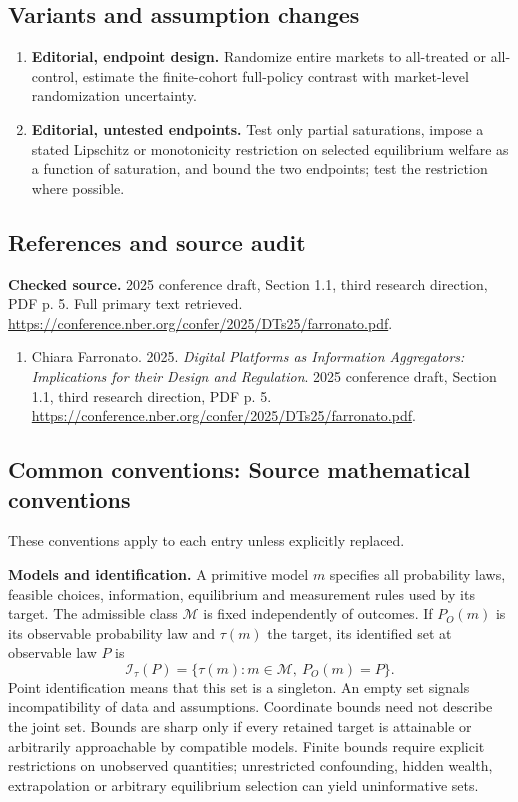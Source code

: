 \documentclass[11pt,a4paper]{article}
\begin{document}
\subsection*{Variants and assumption changes}
\begin{enumerate}
\item \textbf{Editorial, endpoint design.} Randomize entire markets to all-treated or all-control, estimate the finite-cohort full-policy contrast with market-level randomization uncertainty.
\item \textbf{Editorial, untested endpoints.} Test only partial saturations, impose a stated Lipschitz or monotonicity restriction on selected equilibrium welfare as a function of saturation, and bound the two endpoints; test the restriction where possible.
\end{enumerate}
\subsection*{References and source audit}
\textbf{Checked source.} 2025 conference draft, Section 1.1, third research direction, PDF p. 5. Full primary text retrieved. \url{https://conference.nber.org/confer/2025/DTs25/farronato.pdf}.
\begin{enumerate}\raggedright
\item\hypertarget{definitions:source:30007703:1}{} Chiara Farronato. 2025. \emph{Digital Platforms as Information Aggregators: Implications for their Design and Regulation}. 2025 conference draft, Section 1.1, third research direction, PDF p. 5.
\url{https://conference.nber.org/confer/2025/DTs25/farronato.pdf}.
\end{enumerate}

\subsection*{Common conventions: Source mathematical conventions}

These conventions apply to each entry unless explicitly replaced.

\textbf{Models and identification.} A primitive model \(m\) specifies all probability laws, feasible choices, information, equilibrium and measurement rules used by its target. The admissible class \(\mathcal M\) is fixed independently of outcomes. If \(P_O(m)\) is its observable probability law and \(\tau(m)\) the target, its identified set at observable law \(P\) is
\[
 \mathcal I_\tau(P)=\{\tau(m):m\in\mathcal M,\ P_O(m)=P\}.
\]
Point identification means that this set is a singleton. An empty set signals incompatibility of data and assumptions. Coordinate bounds need not describe the joint set. Bounds are sharp only if every retained target is attainable or arbitrarily approachable by compatible models. Finite bounds require explicit restrictions on unobserved quantities; unrestricted confounding, hidden wealth, extrapolation or arbitrary equilibrium selection can yield uninformative sets.
\end{document}
